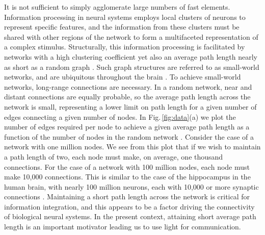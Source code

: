\documentclass[twocolumn]{article}
\begin{document}
It is not sufficient to simply agglomerate large numbers of fast elements. Information processing in neural systems employs local clusters of neurons to represent specific features, and the information from these clusters must be shared with other regions of the network to form a multifaceted representation of a complex stimulus. Structurally, this information processing is facilitated by networks with a high clustering coefficient yet also an average path length nearly as short as a random graph \cite{eskn2015}. Such graph structures are referred to as small-world networks, and are ubiquitous throughout the brain \cite{sp2010}. To achieve small-world networks, long-range connections are necessary. In a random network, near and distant connections are equally probable, so the average path length across the network is small, representing a lower limit on path length for a given number of edges connecting a given number of nodes. In Fig.\,\ref{fig:data}(a) we plot the number of edges required per node to achieve a given average path length as a function of the number of nodes in the random network \cite{sh2018_ICRC}. Consider the case of a network with one million nodes. We see from this plot that if we wish to maintain a path length of two, each node must make, on average, one thousand connections. For the case of a network with 100 million nodes, each node must make 10,000 connections. This is similar to the case of the hippocampus in the human brain, with nearly 100 million neurons, each with 10,000 or more synaptic connections \cite{bu2006}. Maintaining a short path length across the network is critical for information integration, and this appears to be a factor driving the connectivity of biological neural systems. In the present context, attaining short average path length is an important motivator leading us to use light for communication.
\end{document}
